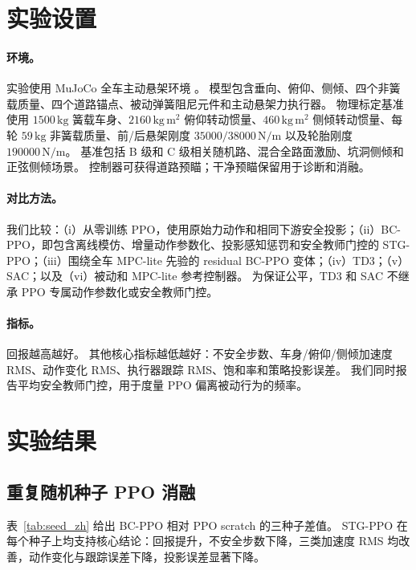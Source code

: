 \documentclass[UTF8,letterpaper,twocolumn]{ctexart}
\begin{document}
\section{实验设置}

\paragraph{环境。}
实验使用 MuJoCo 全车主动悬架环境 \citep{todorov2012mujoco}。
模型包含垂向、俯仰、侧倾、四个非簧载质量、四个道路锚点、被动弹簧阻尼元件和主动悬架力执行器。
物理标定基准使用 $1500\,\mathrm{kg}$ 簧载车身、$2160\,\mathrm{kg\,m^2}$ 俯仰转动惯量、$460\,\mathrm{kg\,m^2}$ 侧倾转动惯量、每轮 $59\,\mathrm{kg}$ 非簧载质量、前/后悬架刚度 $35000/38000\,\mathrm{N/m}$ 以及轮胎刚度 $190000\,\mathrm{N/m}$。
基准包括 B 级和 C 级相关随机路、混合全路面激励、坑洞侧倾和正弦侧倾场景。
控制器可获得道路预瞄；干净预瞄保留用于诊断和消融。

\paragraph{对比方法。}
我们比较：（i）从零训练 PPO，使用原始力动作和相同下游安全投影；（ii）BC-PPO，即包含离线模仿、增量动作参数化、投影感知惩罚和安全教师门控的 STG-PPO；（iii）围绕全车 MPC-lite 先验的 residual BC-PPO 变体；（iv）TD3；（v）SAC；以及（vi）被动和 MPC-lite 参考控制器。
为保证公平，TD3 和 SAC 不继承 PPO 专属动作参数化或安全教师门控。

\paragraph{指标。}
回报越高越好。
其他核心指标越低越好：不安全步数、车身/俯仰/侧倾加速度 RMS、动作变化 RMS、执行器跟踪 RMS、饱和率和策略投影误差。
我们同时报告平均安全教师门控，用于度量 PPO 偏离被动行为的频率。

\section{实验结果}

\subsection{重复随机种子 PPO 消融}

表~\ref{tab:seed_zh} 给出 BC-PPO 相对 PPO scratch 的三种子差值。
STG-PPO 在每个种子上均支持核心结论：回报提升，不安全步数下降，三类加速度 RMS 均改善，动作变化与跟踪误差下降，投影误差显著下降。
\end{document}
